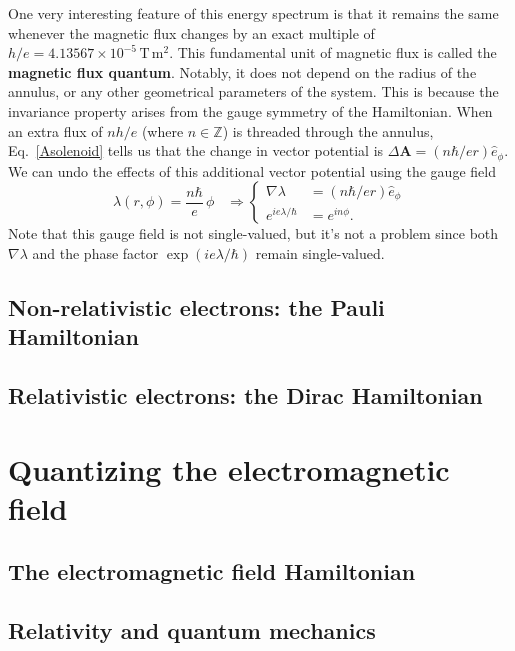 \documentclass[pra,12pt]{revtex4}
\begin{document}
One very interesting feature of this energy spectrum is that it
remains the same whenever the magnetic flux changes by an exact
multiple of $h/e = 4.13567\times10^{-5}\,\mathrm{T}\,\mathrm{m}^2$.
This fundamental unit of magnetic flux is called the \textbf{magnetic
  flux quantum}.  Notably, it does not depend on the radius of the
annulus, or any other geometrical parameters of the system.  This is
because the invariance property arises from the gauge symmetry of the
Hamiltonian.  When an extra flux of $nh/e$ (where $n\in\mathbb{Z}$) is
threaded through the annulus, Eq.~\eqref{Asolenoid} tells us that the
change in vector potential is $\Delta \mathbf{A} = (n\hbar/ e r)
\hat{e}_\phi$.  We can undo the effects of this additional vector
potential using the gauge field
\begin{equation}
  \lambda(r,\phi) = \frac{n\hbar}{e} \, \phi \;\;\;\Rightarrow
  \begin{cases}\nabla \lambda &= \displaystyle (n\hbar/er) \hat{e}_\phi
    \\ \displaystyle e^{ie\lambda/\hbar} &= \displaystyle e^{in\phi}.
  \end{cases}
\end{equation}
Note that this gauge field is not single-valued, but it's not a
problem since both $\nabla\lambda$ and the phase factor
$\exp(ie\lambda/\hbar)$ remain single-valued.

\subsection{Non-relativistic electrons: the Pauli Hamiltonian}


\subsection{Relativistic electrons: the Dirac Hamiltonian}


\section{Quantizing the electromagnetic field}

\subsection{The electromagnetic field Hamiltonian}

\subsection{Relativity and quantum mechanics}
\end{document}
